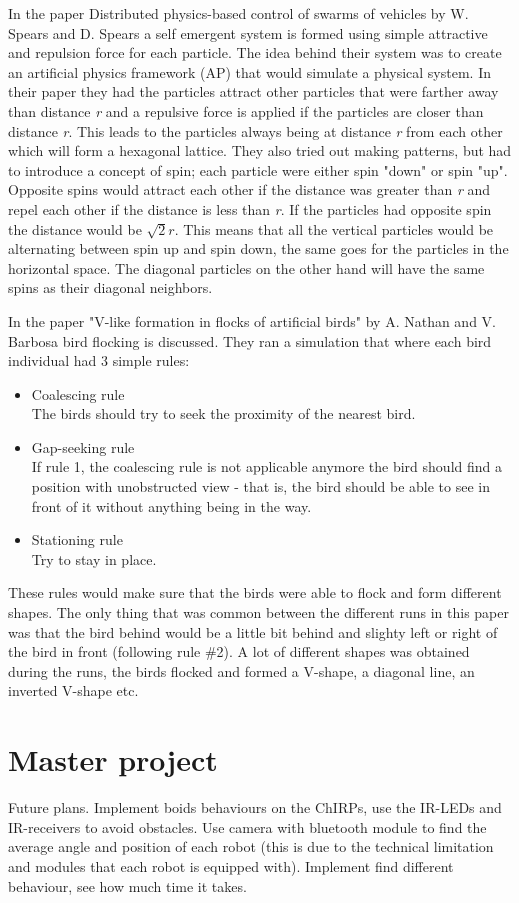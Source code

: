 In the paper Distributed physics-based control of swarms of vehicles by W. Spears and D. Spears a self emergent system is formed using simple attractive and repulsion force for each particle. The idea behind their system was to create an artificial physics framework (AP) that would simulate a physical system. In their paper they had the particles attract other particles that were farther away than distance \textit{r} and a repulsive force is applied if the particles are closer than distance \textit{r}. This leads to the particles always being at distance \textit{r} from each other which will form a hexagonal lattice. They also tried out making patterns, but had to introduce a concept of spin; each particle were either spin "down" or spin "up". Opposite spins would attract each other if the distance was greater than \textit{r} and repel each other if the distance is less than \textit{r}. If the particles had opposite spin the distance would be $\sqrt{2}r$. This means that all the vertical particles would be alternating between spin up and spin down, the same goes for the particles in the horizontal space. The diagonal particles on the other hand will have the same spins as their diagonal neighbors.

In the paper "V-like formation in flocks of artificial birds" by A. Nathan and V. Barbosa bird flocking is discussed. They ran a simulation that where each bird individual had 3 simple rules: 
\begin{itemize}
    \item Coalescing rule \\
        The birds should try to seek the proximity of the nearest bird.
    \item Gap-seeking rule \\
        If rule 1, the coalescing rule is not applicable anymore the bird should find a position with unobstructed view -  that is, the bird should be able to see in front of it without anything being in the way.
    \item Stationing rule \\
        Try to stay in place.
\end{itemize}
These rules would make sure that the birds were able to flock and form different shapes. The only thing that was common between the different runs in this paper was that the bird behind would be a little bit behind and slighty left or right of the bird in front (following rule \#2). A lot of different shapes was obtained during the runs, the birds flocked and formed a V-shape, a diagonal line, an inverted V-shape etc.

\section{Master project}
Future plans.
Implement boids behaviours on the ChIRPs, use the IR-LEDs and IR-receivers to avoid obstacles.
Use camera with bluetooth module to find the average angle and position of each robot (this is due to the technical limitation  and modules that each robot is equipped with).
Implement find different behaviour, see how much time it takes.

